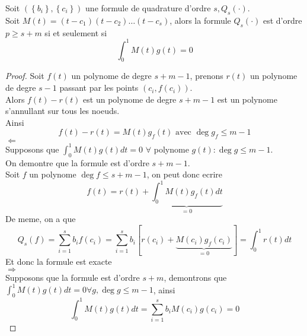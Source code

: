 \documentclass[../main.tex]{subfiles}
\begin{document}
\begin{thm}
	Soit $ ( \left\{ b_i \right\} , \left\{ c_i \right\} ) $ une formule de quadrature d'ordre $s, Q_s( \cdot)  $.\\
	Soit $M( t) = ( t-c_1) ( t-c_2) \ldots ( t-c_s) $, alors la formule $Q_s( \cdot) $ est d'ordre $p \geq s+m$ si et seulement si
	\[ 
	\int_{ 0 }^{ 1 }M( t) g( t) =0
	\]
	
\end{thm}
\begin{proof}
Soit $f( t) $ un polynome de degre $s+m-1$, prenons $r( t) $ un polynome de degre $s-1$ passant par les points $ ( c_i, f( c_i) ) $.\\
Alors $f( t) -r( t) $ est un polynome de degre $s+m-1$ est un polynome s'annullant sur tous les noeuds.\\
Ainsi
\[ 
f( t) -r( t) = M( t) g_f( t) \text{ avec } \deg g_f \leq m-1
\]
$\Leftarrow$\\
Supposons que $ \int_{ 0 }^{ 1 }M( t) g( t) dt =0$ $\forall $ polynome $g( t) : \deg g \leq m-1$.\\
On demontre que la formule est d'ordre $s+m-1$.\\
Soit $f$ un polynome $\deg f \leq s+m-1$, on peut donc ecrire
\[ 
f( t) = r( t) + \underbrace{ \int_{ 0 }^{ 1 }M( t) g_f( t) dt}_{=0}
\]
De meme, on a que 
\[ 
Q_s( f) = \sum_{i=1}^{ s}b_i f( c_i) = \sum_{i=1}^{ s} b_i \left[ r( c_i) +  \underbrace{M( c_i) g_f( c_i)}_{=0	} \right] = \int_{ 0 }^{ 1 }r( t) dt	
\]
Et donc la formule est exacte\\
$\Rightarrow$ \\
Supposons que la formule est d'ordre $s+m$, demontrons que $ \int_{ 0 }^{ 1 }M( t) g( t) dt = 0 \forall g, \deg g \leq m-1$, ainsi
\[ 
\int_{ 0 }^{ 1 }M( t) g( t) dt = \sum_{i=1}^{ s}b_i M( c_i) g( c_i)  =0
\]



\end{proof}

	
\end{document}
